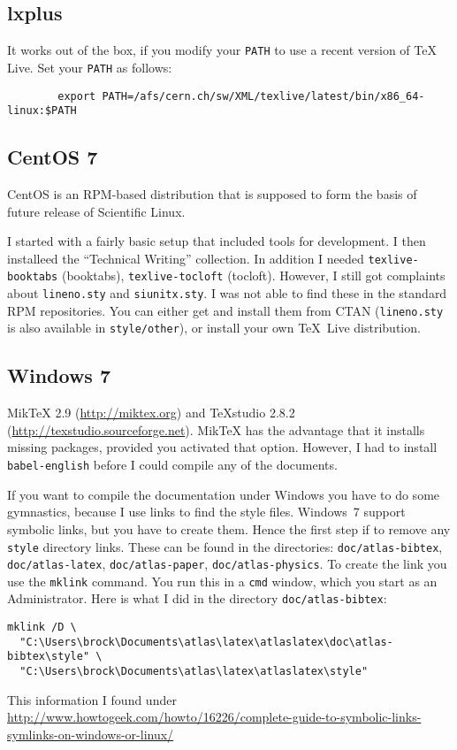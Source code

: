 \documentclass[koma,UKenglish]{style/atlasdoc}
\newcommand{\File}[1]{\texttt{#1}\xspace}
\newcommand{\Package}[1]{\texttt{#1}\xspace}
\begin{document}
\subsection{lxplus} 

It works out of the box, if you modify your \texttt{PATH} to use a recent version of TeX Live.
Set your \texttt{PATH} as follows:
\begin{verbatim}
		export PATH=/afs/cern.ch/sw/XML/texlive/latest/bin/x86_64-linux:$PATH
\end{verbatim}

\subsection{CentOS 7} 

CentOS is an RPM-based distribution that is supposed to form the basis of future
release of Scientific Linux.

I started with a fairly basic setup that included tools for development.
I then installeed the \enquote{Technical Writing} collection.
In addition I needed \Package{texlive-booktabs} (booktabs), \Package{texlive-tocloft} (tocloft).
However, I still got complaints about \File{lineno.sty} and \File{siunitx.sty}.
I was not able to find these in the standard RPM repositories.
You can either get and install them from CTAN (\File{lineno.sty} is also available in \File{style/other}),
or install your own \TeX\ Live distribution.


\subsection{Windows 7}

MikTeX 2.9 (\url{http://miktex.org}) and TeXstudio 2.8.2 (\url{http://texstudio.sourceforge.net}).
MikTeX has the advantage that it installs missing packages, provided you activated that option.
However, I had to install \Package{babel-english} before I could compile any of the documents.

If you want to compile the documentation under Windows you have to do some gymnastics,
because I use links to find the style files.
Windows~7 support symbolic links, but you have to create them.
Hence the first step if to remove any \texttt{style} directory links.
These can be found in the directories: 
\File{doc/atlas-bibtex}, \File{doc/atlas-latex}, \File{doc/atlas-paper}, \File{doc/atlas-physics}.
To create the link you use the \Package{mklink} command.
You run this in a \Package{cmd} window, which you start as an Administrator.
Here is what I did in the directory \File{doc/atlas-bibtex}:
\begin{verbatim}
mklink /D \
  "C:\Users\brock\Documents\atlas\latex\atlaslatex\doc\atlas-bibtex\style" \
  "C:\Users\brock\Documents\atlas\latex\atlaslatex\style"
\end{verbatim}
This information I found under
\url{http://www.howtogeek.com/howto/16226/complete-guide-to-symbolic-links-symlinks-on-windows-or-linux/}
\end{document}
